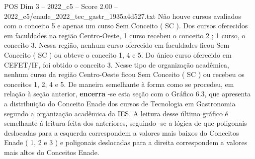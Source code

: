 \begin{textsample}{POS Dim 3 – 2022\_c5 – Score 2.00 – 2022\_c5/enade\_2022\_tec\_gastr\_1935a4d527.txt}
Não houve cursos avaliados com o conceito 5 e apenas um curso Sem Conceito ( SC ).
Dos cursos oferecidos em faculdades na região Centro-Oeste, 1 curso recebeu o conceito 2 ; 1 curso, o conceito 3.
Nessa região, nenhum curso oferecido em faculdades ficou Sem Conceito ( SC ) ou obteve o conceito 1, 4 e 5.
Do único curso oferecido em CEFET/IF, foi obtido o conceito 3.
Nesse tipo de organização acadêmica, nenhum curso da região Centro-Oeste ficou Sem Conceito ( SC ) ou recebeu os conceitos 1, 2, 4 e 5.
De maneira semelhante à forma como se procedeu, em relação à seção anterior, \textbf{encerra} -se esta seção com o Gráfico 6.3, que apresenta a distribuição do Conceito Enade dos cursos de Tecnologia em Gastronomia segundo a organização acadêmica da IES.
A leitura desse último gráfico é semelhante à leitura feita dos anteriores, seguindo -se a lógica de que poligonais deslocadas para a esquerda correspondem a valores mais baixos do Conceitos Enade ( 1, 2 e 3 ) e poligonais deslocadas para a direita correspondem a valores mais altos do Conceitos Enade.

\end{textsample}
